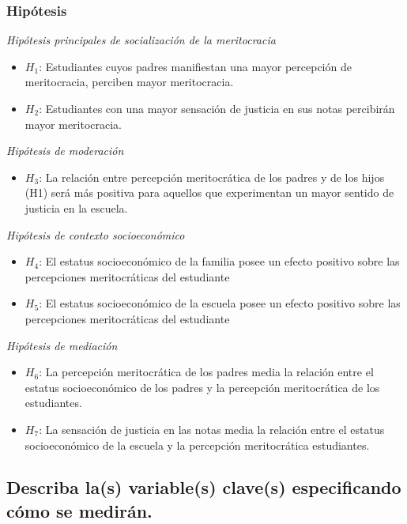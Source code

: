 \documentclass[
  12pt,
]{article}
\providecommand{\tightlist}{%
  \setlength{\itemsep}{0pt}\setlength{\parskip}{0pt}}
\begin{document}
\hypertarget{hipuxf3tesis}{%
\subsubsection{Hipótesis}\label{hipuxf3tesis}}

\emph{Hipótesis principales de socialización de la meritocracia}

\begin{itemize}
\item
  \(H_1\): Estudiantes cuyos padres manifiestan una mayor percepción de
  meritocracia, perciben mayor meritocracia.
\item
  \(H_2\): Estudiantes con una mayor sensación de justicia en sus notas
  percibirán mayor meritocracia.
\end{itemize}

\emph{Hipótesis de moderación}

\begin{itemize}
\tightlist
\item
  \(H_3\): La relación entre percepción meritocrática de los padres y de
  los hijos (H1) será más positiva para aquellos que experimentan un
  mayor sentido de justicia en la escuela.
\end{itemize}

\emph{Hipótesis de contexto socioeconómico}

\begin{itemize}
\item
  \(H_4\): El estatus socioeconómico de la familia posee un efecto
  positivo sobre las percepciones meritocráticas del estudiante
\item
  \(H_5\): El estatus socioeconómico de la escuela posee un efecto
  positivo sobre las percepciones meritocráticas del estudiante
\end{itemize}

\emph{Hipótesis de mediación}

\begin{itemize}
\item
  \(H_6\): La percepción meritocrática de los padres media la relación
  entre el estatus socioeconómico de los padres y la percepción
  meritocrática de los estudiantes.
\item
  \(H_7\): La sensación de justicia en las notas media la relación entre
  el estatus socioeconómico de la escuela y la percepción meritocrática
  estudiantes.
\end{itemize}

\hypertarget{describa-las-variables-claves-especificando-cuxf3mo-se-mediruxe1n.}{%
\subsection{Describa la(s) variable(s) clave(s) especificando cómo se
medirán.}\label{describa-las-variables-claves-especificando-cuxf3mo-se-mediruxe1n.}}
\end{document}
